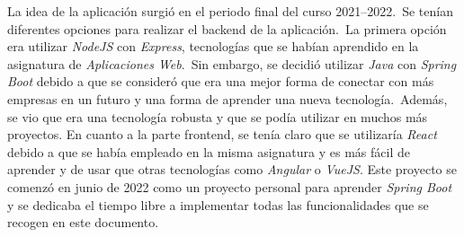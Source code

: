 La idea de la aplicación surgió en el periodo final del curso 2021--2022.\ Se tenían diferentes opciones para realizar
el backend de la aplicación.\ La primera opción era utilizar \textit{NodeJS} con \textit{Express},
tecnologías que se habían aprendido en la asignatura de \textit{Aplicaciones Web}.\ Sin embargo, se decidió utilizar
\textit{Java} con \textit{Spring Boot} debido a que se consideró que era una mejor forma de conectar con más
empresas en un futuro y una forma de aprender una nueva tecnología.\ Además, se vio que era una tecnología
robusta y que se podía utilizar en muchos más proyectos.
En cuanto a la parte frontend, se tenía claro que se utilizaría \textit{React} debido a que se había empleado en la
misma asignatura y es más fácil de aprender y de usar que otras tecnologías como \textit{Angular} o \textit{VueJS}.
Este proyecto se comenzó en junio de 2022 como un proyecto personal para aprender \textit{Spring Boot} y
se dedicaba el tiempo libre a implementar todas las funcionalidades que se recogen en este documento.
